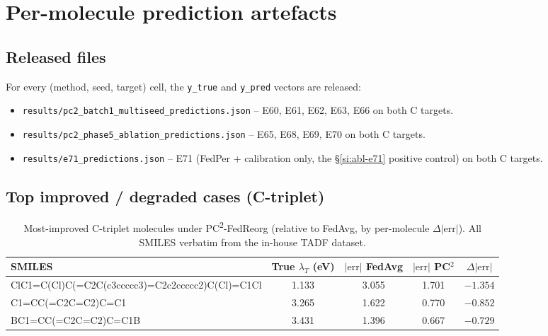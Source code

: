\documentclass[11pt,a4paper]{article}
\newcommand{\PC}{PC\textsuperscript{2}-FedReorg}
\begin{document}
\section{Per-molecule prediction artefacts}\label{si:per-mol}

\subsection{Released files}
For every (method, seed, target) cell, the \verb|y_true| and \verb|y_pred| vectors are released:
\begin{itemize}
  \item \texttt{results/pc2\_batch1\_multiseed\_predictions.json} -- E60, E61, E62, E63, E66 on both C targets.
  \item \texttt{results/pc2\_phase5\_ablation\_predictions.json} -- E65, E68, E69, E70 on both C targets.
  \item \texttt{results/e71\_predictions.json} -- E71 (FedPer + calibration only, the \S\ref{si:abl-e71} positive control) on both C targets.
\end{itemize}

\subsection{Top improved / degraded cases (C-triplet)}

\begin{table}[h]
\centering
\footnotesize
\caption{Most-improved C-triplet molecules under \PC{} (relative to FedAvg, by per-molecule $\Delta|\mathrm{err}|$). All SMILES verbatim from the in-house TADF dataset.}\label{tab:si:improved}
\begin{tabular}{@{}>{\ttfamily\raggedright\arraybackslash\scriptsize}p{7.5cm}cccc@{}}
\toprule
\normalfont SMILES & True $\lambda_T$ (eV) & $|\mathrm{err}|$ FedAvg & $|\mathrm{err}|$ PC$^2$ & $\Delta|\mathrm{err}|$ \\
\midrule
ClC1=C(Cl)C(=C2C(c3ccccc3)=C2c2ccccc2)C(Cl)=C1Cl & 1.133 & 3.055 & 1.701 & $-1.354$ \\
C1=CC(=C2C=C2)C=C1                                & 3.265 & 1.622 & 0.770 & $-0.852$ \\
BC1=CC(=C2C=C2)C=C1B                              & 3.431 & 1.396 & 0.667 & $-0.729$ \\
\bottomrule
\end{tabular}
\end{table}
\end{document}
